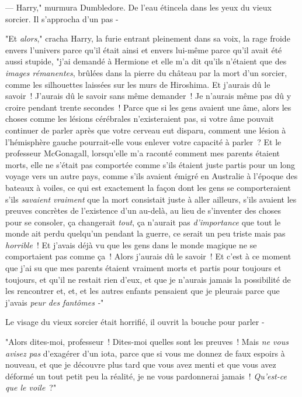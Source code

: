 --- Harry," murmura Dumbledore. De l'eau étincela dans les yeux du vieux sorcier. Il s'approcha d'un pas -

"Et \emph{alors}," cracha Harry, la furie entrant pleinement dans sa voix, la rage froide envers l'univers parce qu'il était ainsi et envers lui-même parce qu'il avait été aussi stupide, "j'ai demandé à Hermione et elle m'a dit qu'ils n'étaient que des \emph{images rémanentes}, brûlées dans la pierre du château par la mort d'un sorcier, comme les silhouettes laissées sur les murs de Hiroshima. Et j'aurais dû le savoir~! J'aurais dû le savoir sans même demander~! Je n'aurais même pas dû y croire pendant trente secondes~! Parce que si les gens avaient une âme, alors les choses comme les lésions cérébrales n'existeraient pas, si votre âme pouvait continuer de parler après que votre cerveau eut disparu, comment une lésion à l'hémisphère gauche pourrait-elle vous enlever votre capacité à parler~? Et le professeur McGonagall, lorsqu'elle m'a raconté comment mes parents étaient morts, elle ne s'était pas comportée comme s'ils étaient juste partis pour un long voyage vers un autre pays, comme s'ils avaient émigré en Australie à l'époque des bateaux à voiles, ce qui est exactement la façon dont les gens se comporteraient s'ils \emph{savaient vraiment} que la mort consistait juste à aller ailleurs, s'ils avaient les preuves concrètes de l'existence d'un au-delà, au lieu de s'inventer des choses pour se consoler, ça changerait \emph{tout}, ça n'aurait pas \emph{d'importance} que tout le monde ait perdu quelqu'un pendant la guerre, ce serait un peu triste mais pas \emph{horrible}~! Et j'avais déjà vu que les gens dans le monde magique ne se comportaient pas comme ça~! Alors j'aurais dû le savoir~! Et c'est à ce moment que j'ai su que mes parents étaient vraiment morts et partis pour toujours et toujours, et qu'il ne restait rien d'eux, et que je n'aurais jamais la possibilité de les rencontrer et, et, et les autres enfants pensaient que je pleurais parce que j'avais \emph{peur des fantômes -}"

Le visage du vieux sorcier était horrifié, il ouvrit la bouche pour parler -

"Alors dites-moi, professeur~! Dites-moi quelles sont les preuves~! Mais \emph{ne vous avisez pas} d'exagérer d'un iota, parce que si vous me donnez de faux espoirs à nouveau, et que je découvre plus tard que vous avez menti et que vous avez déformé un tout petit peu la réalité, je ne vous pardonnerai jamais~! \emph{Qu'est-ce que le voile}~?"

